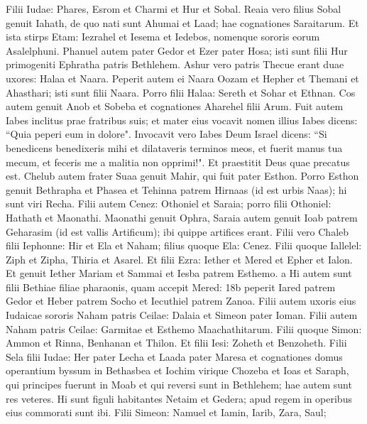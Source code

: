 \begin{biblechapter}  
\verse Filii Iudae: Phares, Esrom et Charmi et Hur et Sobal. 
\verse Reaia vero filius Sobal genuit Iahath, de quo nati sunt Ahumai et Laad; hae cognationes Saraitarum. 
\verse Et ista stirps Etam: Iezrahel et Iesema et Iedebos, nomenque sororis eorum Asalelphuni. 
\verse Phanuel autem pater Gedor et Ezer pater Hosa; isti sunt filii Hur primogeniti Ephratha patris Bethlehem. 
\verse Ashur vero patris Thecue erant duae uxores: Halaa et Naara. 
\verse Peperit autem ei Naara Oozam et Hepher et Themani et Ahasthari; isti sunt filii Naara. 
\verse Porro filii Halaa: Sereth et Sohar et Ethnan. 
\verse Cos autem genuit Anob et Sobeba et cognationes Aharehel filii Arum. 
\verse Fuit autem Iabes inclitus prae fratribus suis; et mater eius vocavit nomen illius Iabes dicens: “Quia peperi eum in dolore". 
\verse Invocavit vero Iabes Deum Israel dicens: “Si benedicens benedixeris mihi et dilataveris terminos meos, et fuerit manus tua mecum, et feceris me a malitia non opprimi!". Et praestitit Deus quae precatus est. 
\verse Chelub autem frater Suaa genuit Mahir, qui fuit pater Esthon. 
\verse Porro Esthon genuit Bethrapha et Phasea et Tehinna patrem Hirnaas (id est urbis Naas); hi sunt viri Recha. 
\verse Filii autem Cenez: Othoniel et Saraia; porro filii Othoniel: Hathath et Maonathi. 
\verse Maonathi genuit Ophra, Saraia autem genuit Ioab patrem Geharasim (id est vallis Artificum); ibi quippe artifices erant. 
\verse Filii vero Chaleb filii Iephonne: Hir et Ela et Naham; filius quoque Ela: Cenez. 
\verse Filii quoque Iallelel: Ziph et Zipha, Thiria et Asarel. 
\verse Et filii Ezra: Iether et Mered et Epher et Ialon. Et genuit Iether Mariam et Sammai et Iesba patrem Esthemo. 
\verse a Hi autem sunt filii Bethiae filiae pharaonis, quam accepit Mered: 18b peperit Iared patrem Gedor et Heber patrem Socho et Iecuthiel patrem Zanoa. 
\verse Filii autem uxoris eius Iudaicae sororis Naham patris Ceilae: Dalaia et Simeon pater Ioman. Filii autem Naham patris Ceilae: Garmitae et Esthemo Maachathitarum. 
\verse Filii quoque Simon: Ammon et Rinna, Benhanan et Thilon. Et filii Iesi: Zoheth et Benzoheth. 
\verse Filii Sela filii Iudae: Her pater Lecha et Laada pater Maresa et cognationes domus operantium byssum in Bethasbea 
\verse et Iochim virique Chozeba et Ioas et Saraph, qui principes fuerunt in Moab et qui reversi sunt in Bethlehem; hae autem sunt res veteres. 
\verse Hi sunt figuli habitantes Netaim et Gedera; apud regem in operibus eius commorati sunt ibi. 
\verse Filii Simeon: Namuel et Iamin, Iarib, Zara, Saul; 

\end{biblechapter}
